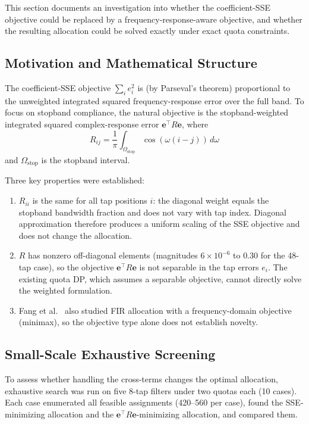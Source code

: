
This section documents an investigation into whether the coefficient-SSE
objective could be replaced by a frequency-response-aware objective, and
whether the resulting allocation could be solved exactly under exact
quota constraints.

\subsection{Motivation and Mathematical Structure}

The coefficient-SSE objective $\sum_i e_i^2$ is (by Parseval's theorem)
proportional to the unweighted integrated squared frequency-response
error over the full band. To focus on stopband compliance, the natural
objective is the stopband-weighted integrated squared complex-response
error $\mathbf{e}^\top R \mathbf{e}$, where
\begin{equation}
R_{ij} = \frac{1}{\pi} \int_{\Omega_\text{stop}} \cos(\omega(i-j))\,d\omega
\end{equation}
and $\Omega_\text{stop}$ is the stopband interval.

Three key properties were established:
\begin{enumerate}
\item $R_{ii}$ is the same for all tap positions $i$: the diagonal
weight equals the stopband bandwidth fraction and does not vary with
tap index. Diagonal approximation therefore produces a uniform
scaling of the SSE objective and does not change the allocation.
\item $R$ has nonzero off-diagonal elements (magnitudes $6\times10^{-6}$
to $0.30$ for the 48-tap case), so the objective $\mathbf{e}^\top R
\mathbf{e}$ is not separable in the tap errors $e_i$. The existing
quota DP, which assumes a separable objective, cannot directly solve
the weighted formulation.
\item Fang et al.~\cite{fang2025mixedprecision} also studied FIR
allocation with a frequency-domain objective (minimax), so the
objective type alone does not establish novelty.
\end{enumerate}

\subsection{Small-Scale Exhaustive Screening}

To assess whether handling the cross-terms changes the optimal
allocation, exhaustive search was run on five 8-tap filters under two
quotas each (10 cases). Each case enumerated all feasible assignments
(420--560 per case), found the SSE-minimizing allocation and the
$\mathbf{e}^\top R \mathbf{e}$-minimizing allocation, and compared them.

